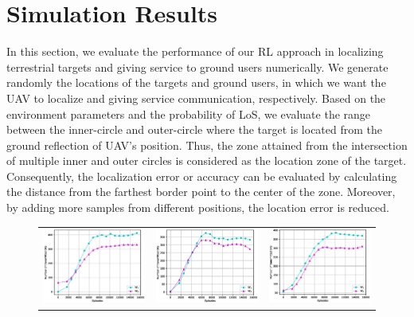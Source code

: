 \documentclass[journal,twocolumn]{IEEEtran}
\begin{document}
{\section{Simulation Results}

In this section, we evaluate the performance of our RL approach in localizing terrestrial targets and giving service to ground users numerically. We generate randomly the locations of the targets and ground users, in which we want the UAV to localize and giving service communication, respectively. Based on the environment parameters  and the probability of LoS, we evaluate the range between the inner-circle and outer-circle where the target is located from the ground reflection of UAV’s position. Thus, the zone attained from the intersection of multiple inner and outer circles  is considered as the location zone of the target. Consequently, the localization error or accuracy can be evaluated by calculating the distance from the farthest border point to the center of the zone. Moreover, by adding more samples from different positions, the location error is reduced.

\begin{figure}[t]
\centering
\begin{tabular}{ccc}
\includegraphics[width=2in]{Figures/10_w_1.eps} & 
\includegraphics[width=2in]{Figures/20_w_1.eps} &
\includegraphics[width=2in]{Figures/30_w_1.eps} \\


\end{tabular}
\end{figure}}
\end{document}
